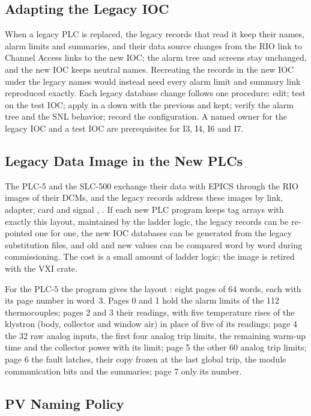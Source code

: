 \subsection{Adapting the Legacy IOC}\label{sec:legacyioc}

When a legacy PLC is replaced, the legacy records that read it keep their names, alarm
limits and summaries, and their data source changes from the RIO link to Channel
Access links to the new IOC; the alarm tree and screens stay unchanged, and the new IOC
keeps neutral names. Recreating the records in the new IOC under the legacy names would
instead need every alarm limit and summary link reproduced exactly. Each legacy
database change follows one procedure: edit; test on the test IOC; apply in a down with
the previous  and  kept; verify the alarm tree and the
SNL behavior; record the configuration. A named owner for the legacy IOC and a test IOC
are prerequisites for I3, I4, I6 and I7.

\subsection{Legacy Data Image in the New PLCs}\label{sec:image}

The PLC-5 and the SLC-500 exchange their data with EPICS through the RIO images of
their DCMs, and the legacy records address these images by link, adapter, card and
signal , . If each new PLC program keeps tag arrays with exactly this
layout, maintained by the ladder logic, the legacy records can be re-pointed one for
one, the new IOC databases can be generated from the legacy substitution files, and
old and new values can be compared word by word during commissioning. The cost is a
small amount of ladder logic; the image is retired with the VXI crate.

For the PLC-5 the program gives the layout : eight pages of 64 words, each with
its page number in word~3. Pages 0 and 1 hold the alarm limits of the 112
thermocouples; pages 2 and 3 their readings, with five temperature rises of the
klystron (body, collector and window air) in place of five of its readings; page 4 the
32 raw analog inputs, the first four analog trip limits, the remaining warm-up time
and the collector power with its limit; page 5 the other 60 analog trip limits; page 6
the fault latches, their copy frozen at the last global trip, the module communication
bits and the summaries; page 7 only its number.

\subsection{PV Naming Policy}\label{sec:naming}

